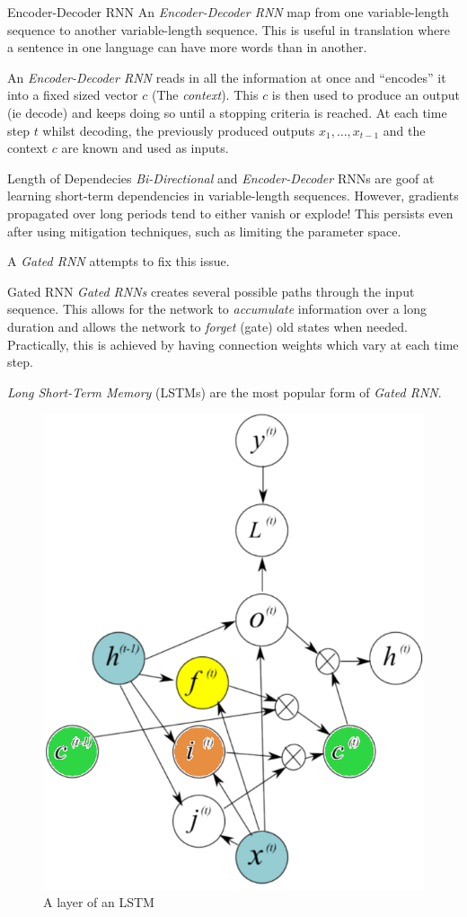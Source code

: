 \documentclass[11pt,a4paper]{article}
\begin{document}
  \begin{definition}{Encoder-Decoder RNN}
    An \textit{Encoder-Decoder RNN} map from one variable-length sequence to another variable-length sequence. This is useful in translation where a sentence in one language can have more words than in another.
    \par An \textit{Encoder-Decoder RNN} reads in all the information at once and ``encodes'' it into a fixed sized vector $c$ (The \textit{context}). This $c$ is then used to produce an output (ie decode) and keeps doing so until a stopping criteria is reached. At each time step $t$ whilst decoding, the previously produced outputs $x_1,\dots,x_{t-1}$ and the context $c$ are known and used as inputs.
  \end{definition}

  \begin{remark}{Length of Dependecies}
    \textit{Bi-Directional} and \textit{Encoder-Decoder} RNNs are goof at learning short-term dependencies in variable-length sequences. However, gradients propagated over long periods tend to either vanish or explode! This persists even after using mitigation techniques, such as limiting the parameter space.
    \par A \textit{Gated RNN} attempts to fix this issue.
  \end{remark}

  \begin{definition}{Gated RNN}
    \textit{Gated RNNs} creates several possible paths through the input sequence. This allows for the network to \textit{accumulate} information over a long duration and allows the network to \textit{forget} (gate) old states when needed. Practically, this is achieved by having connection weights which vary at each time step.
    \par \textit{Long Short-Term Memory} (LSTMs) are the most popular form of \textit{Gated RNN}.
  \end{definition}

  \begin{figure}[ht!]
    \centering
    \includegraphics[width=.3\textwidth]{LSTM.PNG}
    \caption{A layer of an LSTM}
    \label{fig:LSTM}
  \end{figure}
\end{document}
